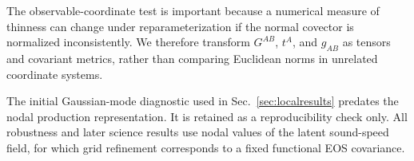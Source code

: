 The observable-coordinate test is important because a numerical measure of
thinness can change under reparameterization if the normal covector is
normalized inconsistently.  We therefore transform \(G^{AB}\), \(t^A\), and
\(g_{AB}\) as tensors and covariant metrics, rather than comparing Euclidean
norms in unrelated coordinate systems.

The initial Gaussian-mode diagnostic used in
Sec.~\ref{sec:localresults} predates the nodal production representation.  It
is retained as a reproducibility check only.  All robustness and later
science results use nodal values of the latent sound-speed field, for which
grid refinement corresponds to a fixed functional EOS covariance.
